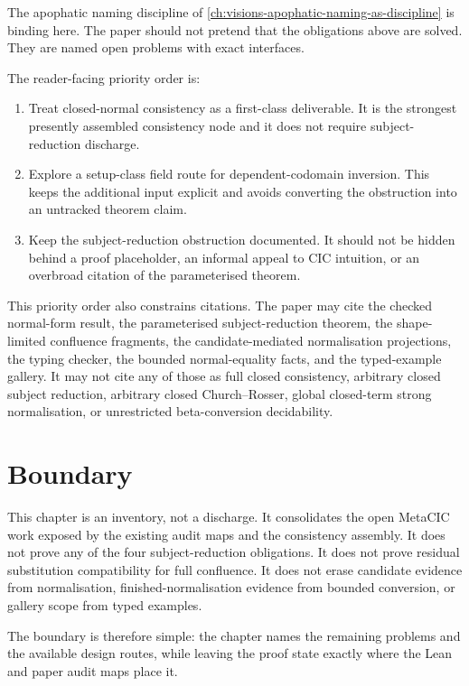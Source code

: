 The apophatic naming discipline of
\autoref{ch:visions-apophatic-naming-as-discipline} is binding here. The paper
should not pretend that the obligations above are solved. They are named open
problems with exact interfaces.

The reader-facing priority order is:

\begin{enumerate}
\item Treat closed-normal consistency as a first-class deliverable. It is the
  strongest presently assembled consistency node and it does not require
  subject-reduction discharge.
\item Explore a setup-class field route for dependent-codomain inversion. This
  keeps the additional input explicit and avoids converting the obstruction
  into an untracked theorem claim.
\item Keep the subject-reduction obstruction documented. It should not be
  hidden behind a proof placeholder, an informal appeal to CIC intuition, or an
  overbroad citation of the parameterised theorem.
\end{enumerate}

This priority order also constrains citations. The paper may cite the checked
normal-form result, the parameterised subject-reduction theorem, the
shape-limited confluence fragments, the candidate-mediated normalisation
projections, the typing checker, the bounded normal-equality facts, and the
typed-example gallery. It may not cite any of those as full closed consistency,
arbitrary closed subject reduction, arbitrary closed Church--Rosser, global
closed-term strong normalisation, or unrestricted beta-conversion
decidability.

\section{Boundary}
\label{sec:metacic-open-problems-boundary}

This chapter is an inventory, not a discharge. It consolidates the open
MetaCIC work exposed by the existing audit maps and the consistency assembly.
It does not prove any of the four subject-reduction obligations. It does not
prove residual substitution compatibility for full confluence. It does not
erase candidate evidence from normalisation, finished-normalisation evidence
from bounded conversion, or gallery scope from typed examples.

The boundary is therefore simple: the chapter names the remaining problems and
the available design routes, while leaving the proof state exactly where the
Lean and paper audit maps place it.


